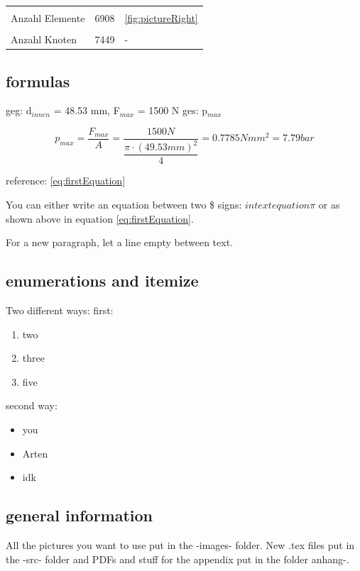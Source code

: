 \begin{table}[H]
\begin{tabular}{@{}lll@{}}
                            &                                                                               &                               \\
    Anzahl Elemente         & 6908                                                                          & \ref{fig:pictureRight}        \\
                            &                                                                               &                               \\
    Anzahl Knoten           & 7449                                                                          & -                             \\ \bottomrule
    \end{tabular}
\end{table}

\newpage

\subsection{formulas}

geg: d$_{innen}$ = 48.53 mm, F$_{max}$ = 1500 N\newline
ges: p$_{max}$

\begin{equation}
    p_{max}=\dfrac{F_{max}}{A}=\dfrac{1500N}{\dfrac{\pi \cdot (49.53mm)^{2}}{4}}=0.7785Nmm^{2}=7.79bar
    \label{eq:firstEquation}
\end{equation}

reference: \ref{eq:firstEquation}

You can either write an equation between two \$ signs: $in text equation \pi$ or as shown above in equation \ref{eq:firstEquation}.

For a new paragraph, let a line empty between text.

\subsection{enumerations and itemize}

Two different ways: first:

\begin{enumerate}
    \item two
    \item three
    \item five
\end{enumerate}

second way:

\begin{itemize}
    \item you
    \item Arten
    \item idk
\end{itemize}

\subsection{general information}

All the pictures you want to use put in the -images- folder. New .tex files put in the -src- folder and PDFs and stuff for the appendix put in the folder anhang-.